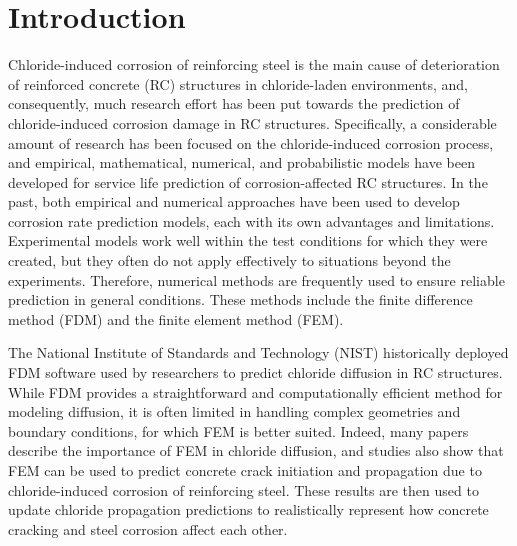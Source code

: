 \documentclass[conference]{IEEEtran}
\begin{document}
\section{Introduction}

Chloride-induced corrosion of reinforcing steel is the main cause of deterioration of reinforced concrete (RC) structures in chloride-laden environments\cite{b1}, and, consequently, much research effort has been put towards the prediction of chloride-induced corrosion damage in RC structures\cite{b2,b3,b4,b5,b6}. 
Specifically, a considerable amount of research has been focused on the chloride-induced corrosion process, and empirical, mathematical, numerical, and probabilistic models have been developed for service life prediction of corrosion-affected RC structures\cite{b2,b3,b8}.
In the past, both empirical and numerical approaches have been used to develop corrosion rate prediction models, each with its own advantages and limitations.
Experimental models work well within the test conditions for which they were created, but they often do not apply effectively to situations beyond the experiments\cite{b9,b10,b11}. 
Therefore, numerical methods are frequently used to ensure reliable prediction in general conditions. These methods include the finite difference method (FDM) and the finite element method (FEM). 

The National Institute of Standards and Technology (NIST) historically deployed FDM software\cite{b18,b19} used by researchers to predict chloride diffusion in RC structures\cite{b19}.
While FDM provides a straightforward and computationally efficient method for modeling diffusion, it is often limited in handling complex geometries and boundary conditions, for which FEM is better suited. 
Indeed, many papers describe the importance of FEM in chloride diffusion\cite{b12,b14}, and studies \cite{b13}  also show that FEM can be used to predict concrete crack initiation and propagation due to chloride-induced corrosion of reinforcing steel. 
These results are then used to update chloride propagation predictions to realistically represent how concrete cracking and steel corrosion affect each other. 
\end{document}
